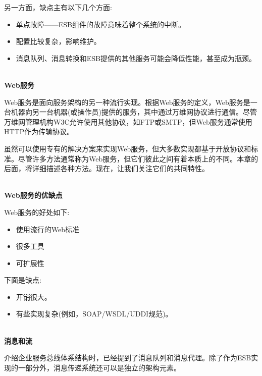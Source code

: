 另一方面，缺点主有以下几个方面:

\begin{itemize}
\item 
单点故障——ESB组件的故障意味着整个系统的中断。

\item 
配置比较复杂，影响维护。

\item 
消息队列、消息转换和ESB提供的其他服务可能会降低性能，甚至成为瓶颈。
\end{itemize}

\hspace*{\fill} \\ %
\noindent
\textbf{Web服务}

Web服务是面向服务架构的另一种流行实现。根据Web服务的定义，Web服务是一台机器向另一台机器(或操作员)提供的服务，其中通过万维网协议进行通信。尽管万维网管理机构W3C允许使用其他协议，如FTP或SMTP，但Web服务通常使用HTTP作为传输协议。

虽然可以使用专有的解决方案来实现Web服务，但大多数实现都基于开放协议和标准。尽管许多方法通常称为Web服务，但它们彼此之间有着本质上的不同。本章的后面，将详细描述各种方法。现在，让我们关注它们的共同特性。

\hspace*{\fill} \\ %
\noindent
\textbf{Web服务的优缺点}

Web服务的好处如下:

\begin{itemize}
\item 
使用流行的Web标准

\item 
很多工具

\item 
可扩展性
\end{itemize}

下面是缺点:

\begin{itemize}
\item 
开销很大。

\item 
有些实现复杂(例如，SOAP/WSDL/UDDI规范)。
\end{itemize}

\hspace*{\fill} \\ %
\noindent
\textbf{消息和流}

介绍企业服务总线体系结构时，已经提到了消息队列和消息代理。除了作为ESB实现的一部分外，消息传递系统还可以是独立的架构元素。

